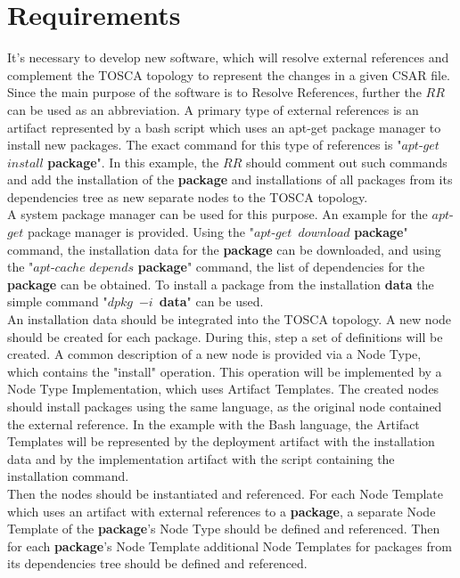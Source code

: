 
\chapter{Requirements}\label{chap:req}
It's necessary to develop new software, which will resolve external references and complement the TOSCA topology to represent the changes in a given CSAR file.
Since the main purpose of the software is to Resolve References, further the $RR$ can be used as an abbreviation. 
A primary type of external references is an artifact represented by a bash script which uses an apt-get package manager to install new packages.
The exact command for this type of references is "$apt$-$get$~$install$ \textbf{package}".
In this example, the $RR$ should comment out such commands and add the installation of the \textbf{package} and installations of all packages from its dependencies tree as new separate nodes to the TOSCA topology. \\
A system package manager can be used for this purpose. 
An example for the $apt$-$get$ package manager is provided. 
Using the "$apt$-$get$~$download$ \textbf{package}" command, the installation data for the \textbf{package} can be downloaded, and using the "$apt$-$cache$ $depends$ \textbf{package}" command, the list of dependencies for the \textbf{package} can be obtained. 
To install a package from the installation \textbf{data} the simple command "$dpkg$~$-i$~\textbf{data}" can be used.\\
An installation data should be integrated into the TOSCA topology. 
A new node should be created for each package. 
During this, step a set of definitions will be created.
A common description of a new node is provided via a Node Type, which contains the "install" operation. 
This operation will be implemented by a Node Type Implementation, which uses Artifact Templates.
The created nodes should install packages using the same language, as the original node contained the external reference.
In the example with the Bash language, the Artifact Templates will be represented by the deployment artifact with the installation data and by the implementation artifact with the script containing the installation command. \\
Then the nodes should be instantiated and referenced.
For each Node Template which uses an artifact with external references to a \textbf{package}, a separate Node Template of the \textbf{package}'s Node Type should be defined and referenced.
Then for each \textbf{package}'s Node Template additional Node Templates for packages from its dependencies tree should be defined and referenced.
